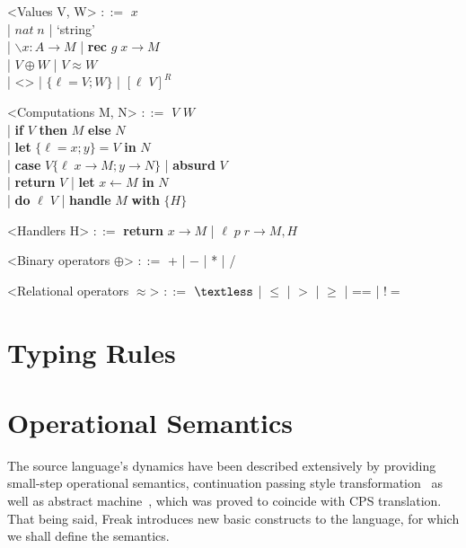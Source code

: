 \documentclass[declaration,shortabstract]{iithesis}
\theoremstyle{definition} \newtheorem{definition}{Definition}[chapter]
\theoremstyle{remark} \newtheorem{remark}[definition]{Observation}
\theoremstyle{plain} \newtheorem{theorem}[definition]{Theorem}
\theoremstyle{plain} \newtheorem{lemma}[definition]{Lemma}
\begin{document}
    \begin{grammar}

        <Values V, W> $::=$ $ x $ \\
            | $nat \; n$ | `string'  \\
            | $ \backslash x : A \rightarrow M $ | \textbf{rec} $ g \; x \rightarrow M $\\
            | $V \oplus W$ | $V \approx W$ \\
            | <> | $ \{ \ell = V; W\} $  | ${[ \ell \; V]}^{R}$

        <Computations M, N> $::=$ $ V $ $ W $ \\
            | \textbf{if} $V$ \textbf{then} $M$ \textbf{else} $N$ \\
            | \textbf{let} $\{\ell  = x; y\} = V$ \textbf{in} $ N $ \\
            | \textbf{case} $V \{ \ell \; x \rightarrow M; y \rightarrow N\}$ | \textbf{absurd} $ V $ \\
            | \textbf{return} $V$ | \textbf{let} $ x \leftarrow M $ \textbf{in} $ N $ \\
            | \textbf{do} $\ell \; V$ | \textbf{handle} $M$ \textbf{with} $ \{ H \} $

        <Handlers H> $::=$ \textbf{return} $ x \rightarrow M $ | $ \ell \; p \; r \rightarrow M, H $

        <Binary operators $\oplus$> $::=$ + | $-$ | * | /

        <Relational operators $\approx$> $::=$ $ \textless $ | $\leqslant$ | $>$ | $\geqslant$ | == | $!= $

    \end{grammar}

\section{Typing Rules}
\section{Operational Semantics}

    The source language's dynamics have been described
    extensively by providing small-step operational semantics,
    continuation passing style transformation~\cite{handlers-cps} as well
    as abstract machine~\cite{liberating-effects}, which was proved to coincide
    with CPS translation. That being said, Freak introduces new basic
    constructs to the language, for which we shall define the semantics.
\end{document}
